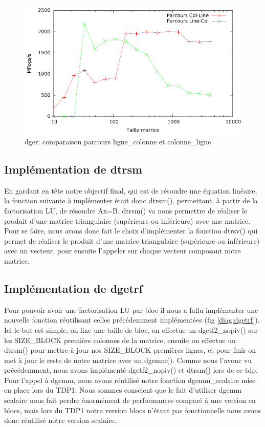 \documentclass{article}
\begin{document}
\begin{figure}[!h]
  \begin{center}
    \includegraphics[scale=0.7]{pictures/dger.pdf}
  \end{center}
  \caption{dger: comparaison parcours ligne\_colonne et colonne\_ligne \label{fig:dger}}
\end{figure}

\subsection{Implémentation de dtrsm}En gardant en tête notre objectif final, qui est de résoudre une équation linéaire, la fonction suivante à implémenter était donc dtrsm(), permettant, à partir de la factorisation LU, de résoudre Ax=B. dtrsm() va nous permettre de réaliser le produit d'une matrice triangulaire (supérieure ou inférieure) avec une matrice. Pour se faire, nous avons donc fait le choix d'implémenter la fonction dtrsv() qui permet de réaliser le produit d'une matrice triangulaire (supérieure ou inférieure) avec un vecteur, pour ensuite l'appeler sur chaque vecteur composant notre matrice.

\subsection{Implémentation de dgetrf}Pour pouvoir avoir une factorisation LU par bloc il nous a fallu implémenter une nouvelle fonction réutilisant celles précédemment implémentées (fig \ref{diag:dgetrf}). Ici le but est simple, on fixe une taille de bloc, on effectue un dgetf2\_nopiv() sur les SIZE\_BLOCK première colonnes de la matrice, ensuite on effectue un dtrsm() pour mettre à jour nos SIZE\_BLOCK premières lignes, et pour finir on met à jour le reste de notre matrice avec un dgemm(). Comme nous l'avonc vu précédemment, nous avons implémenté dgetf2\_nopiv() et dtrsm() lors de ce tdp. Pour l'appel à dgemm, nous avons réutilisé notre fonction dgemm\_scalaire mise en place lors du TDP1. Nous sommes conscient que le fait d'utiliser dgemm scalaire nous fait perdre
énormément de performances comparé à une version en blocs, mais lors du TDP1 notre version blocs n'étant pas fonctionnelle nous avons donc réutilisé notre version scalaire.
\end{document}
